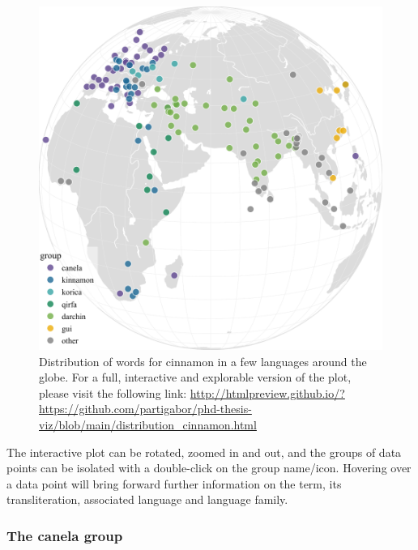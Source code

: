 \begin{figure}[!ht]
    \centering
    \includegraphics[width=\linewidth]{imgs/plots/distribution_cinnamon.pdf}
    \caption[Distribution of words for cinnamon in a few languages around the globe.]{Distribution of words for cinnamon in a few languages around the globe. For a full, interactive and explorable version of the plot, please visit the following link: \url{http://htmlpreview.github.io/?https://github.com/partigabor/phd-thesis-viz/blob/main/distribution_cinnamon.html}}
    \label{fig:distribution_cinnamon}
\end{figure}

\begin{note}
 The interactive plot can be rotated, zoomed in and out, and the groups of data points can be isolated with a double-click on the group name/icon. Hovering over a data point will bring forward further information on the term, its transliteration, associated language and language family.
\end{note}

\subsubsection{The canela group}

